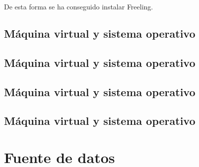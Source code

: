 \documentclass[11pt,twoside]{article}
\numberwithin{equation}{section}
\theoremstyle{plain}
\theoremstyle{definition}
\theoremstyle{remark}
\begin{document}
	

De esta forma se ha conseguido instalar Freeling.

\subsection{Máquina virtual y sistema operativo}

\subsection{Máquina virtual y sistema operativo}

\subsection{Máquina virtual y sistema operativo}

\subsection{Máquina virtual y sistema operativo}

\section{Fuente de datos}








\appendix
\clearpage %
\addappheadtotoc %




\newpage



\end{document}
